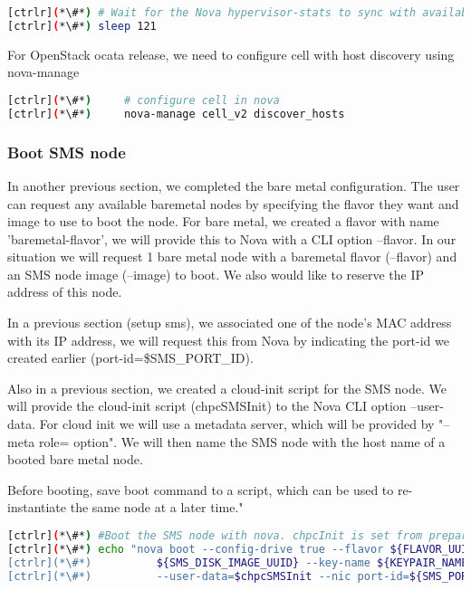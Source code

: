 
\begin{lstlisting}[language=bash,keywords={}]
[ctrlr](*\#*) # Wait for the Nova hypervisor-stats to sync with available Ironic resources
[ctrlr](*\#*) sleep 121
\end{lstlisting} 

	For OpenStack ocata release, we need to configure cell with host discovery using nova-manage 

\begin{lstlisting}[language=bash,keywords={}]
[ctrlr](*\#*)     # configure cell in nova 
[ctrlr](*\#*)     nova-manage cell_v2 discover_hosts
\end{lstlisting} 

\subsubsection{Boot SMS node}

	In another previous section, we completed the bare metal configuration. The user can request any available baremetal nodes by specifying the flavor they want and image to use to boot the node. For bare metal, we created a flavor with name 'baremetal-flavor', we will provide this to Nova with a CLI option --flavor. In our situation we will request 1 bare metal node with a baremetal flavor (--flavor) and an SMS node image (--image) to boot.  We also would like to reserve the IP address of this node. 

	In a previous section (setup sms), we associated one of the node's MAC address with its IP address, we will request this from Nova by indicating the port-id we created earlier (port-id=\${SMS\_PORT\_ID}). 

	Also in a previous section, we created a cloud-init script for the SMS node. We will provide the cloud-init script (chpcSMSInit) to the Nova CLI option --user-data. For cloud init we will use a metadata server, which will be provided by "--meta role= option". We will then name the SMS node with the host name of a booted bare metal node. 

	Before booting, save boot command to a script, which can be used to re-instantiate the same node at a later time."


\begin{lstlisting}[language=bash,keywords={}]
[ctrlr](*\#*) #Boot the SMS node with nova. chpcInit is set from prepare_cloudInit
[ctrlr](*\#*) echo "nova boot --config-drive true --flavor ${FLAVOR_UUID} --image \
[ctrlr](*\#*)          ${SMS_DISK_IMAGE_UUID} --key-name ${KEYPAIR_NAME} --meta role=webservers \
[ctrlr](*\#*)          --user-data=$chpcSMSInit --nic port-id=${SMS_PORT_ID} ${sms_name}" > boot_sms
\end{lstlisting} 

